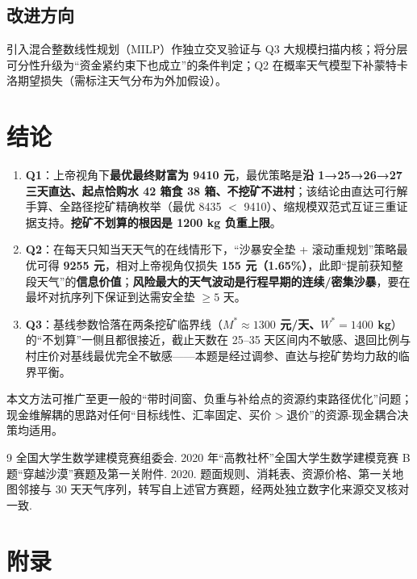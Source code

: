 \documentclass[12pt,a4paper]{ctexart}
\begin{document}
\subsection{改进方向}
引入混合整数线性规划（MILP）作独立交叉验证与 Q3 大规模扫描内核；将分层可分性升级为“资金紧约束下也成立”的条件判定；Q2 在概率天气模型下补蒙特卡洛期望损失（需标注天气分布为外加假设）。

\section{结论}

\begin{enumerate}
  \item \textbf{Q1}：上帝视角下\textbf{最优最终财富为 9410 元}，最优策略是\textbf{沿 1→25→26→27 三天直达、起点恰购水 42 箱食 38 箱、不挖矿不进村}；该结论由直达可行解手算、全路径挖矿精确枚举（最优 8435 $<$ 9410）、缩规模双范式互证三重证据支持。\textbf{挖矿不划算的根因是 1200 kg 负重上限}。
  \item \textbf{Q2}：在每天只知当天天气的在线情形下，“沙暴安全垫 + 滚动重规划”策略最优可得 \textbf{9255 元}，相对上帝视角仅损失 \textbf{155 元（1.65\%）}，此即“提前获知整段天气”的\textbf{信息价值}；\textbf{风险最大的天气波动是行程早期的连续/密集沙暴}，要在最坏对抗序列下保证到达需安全垫 $\ge 5$ 天。
  \item \textbf{Q3}：基线参数恰落在两条挖矿临界线（\textbf{$M^*\approx 1300$ 元/天、$W^*=1400$ kg}）的“不划算”一侧且都很接近，截止天数在 25–35 天区间内不敏感、退回比例与村庄价对基线最优完全不敏感——本题是经过调参、直达与挖矿势均力敌的临界平衡。
\end{enumerate}

本文方法可推广至更一般的“带时间窗、负重与补给点的资源约束路径优化”问题；现金维解耦的思路对任何“目标线性、汇率固定、买价$>$退价”的资源-现金耦合决策均适用。

\begin{thebibliography}{9}
 全国大学生数学建模竞赛组委会. 2020 年“高教社杯”全国大学生数学建模竞赛 B 题“穿越沙漠”赛题及第一关附件. 2020.
 题面规则、消耗表、资源价格、第一关地图邻接与 30 天天气序列，转写自上述官方赛题，经两处独立数字化来源交叉核对一致.
\end{thebibliography}

\appendix
\section{附录}
\end{document}
